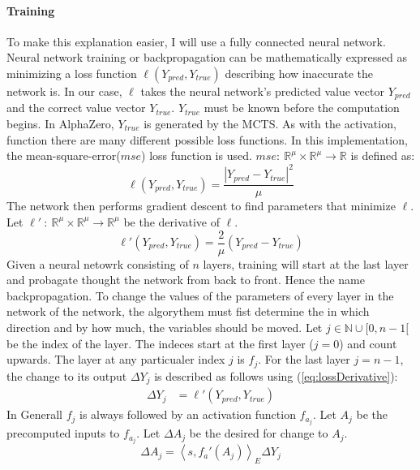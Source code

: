 \documentclass[12pt]{article}
\newcommand{\quckeq}[1]{(\ref{#1})}
\newcommand{\quickeq}[1]{\quckeq{#1}}
\begin{document}
\paragraph{Training} 
To make this explanation easier, I will use a fully connected neural network.
Neural network training or backpropagation can be mathematically expressed as minimizing a loss function  \(\ell(Y_{pred}, Y_{true})\) describing how inaccurate the network is. In our case, \(\ell\) takes the neural network's predicted value vector \(Y_{pred}\) and the correct value vector \(Y_{true}\). \(Y_{true}\) must be known before the computation begins. In AlphaZero, \(Y_{true}\) is generated by the MCTS. As with the activation, function there are many different possible loss functions. In this implementation, the mean-square-error(\(mse\)) loss function is used. \(mse:~\mathbb R^\mu\times\mathbb R^\mu \to \mathbb R\) is defined as:
\begin{equation} \label{eq:NN:loss_mse}
\ell(Y_{pred}, Y_{true}) = \frac{|Y_{pred} - Y_{true}|^2}{\mu}
\end{equation}
The network then performs gradient descent to find parameters that minimize \(\ell\).  Let \(\ell'~:~\mathbb R^\mu \times \mathbb R^\mu \to \mathbb R^\mu\) be the derivative of \(\ell\).
\begin{equation}\label{eq:lossDerivative}
\ell'(Y_{pred}, Y_{true}) = \frac{2}{\mu} \left(Y_{pred} - Y_{true}\right)
\end{equation}
Given a neural netowrk consisting of \(n\) layers, training will start at the last layer and probagate thought the network from back to front. Hence the name backpropagation. To change the values of the parameters of every layer in the network of the network, the algorythem must fist determine the in which direction and by how much, the variables should be moved. Let \(j \in \mathbb N\cup [0,n-1[\) be the index of the layer. The indeces start at the first layer (\(j=0\)) and count upwards. The layer at any particualer index \(j\) is \(f_j\). For the last layer \(j=n-1\), the change to its output \(\Delta Y_j\) is described as follows using  \quickeq{eq:lossDerivative}:
\begin{align}
\Delta Y_j &= \ell'(Y_{pred}, Y_{true})
\end{align}
In Generall \(f_j\) is always followed by an activation function \(f_{a_j}\). Let \(A_j\) be the precomputed inputs to \(f_{a_j}\). Let \(\Delta A_j\) be the desired for change to \(A_j\).
\begin{equation}\label{eq:NN:deltaA}
\Delta A_j = \left<s, f_a'(A_j)\right>_E\Delta Y_j
\end{equation}
\end{document}

